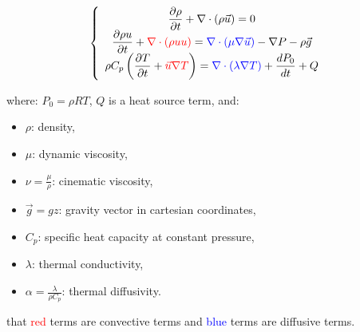 $$
\left\{
\begin{array}{c}
\displaystyle{\frac{\partial \rho }{\partial t} + \nabla \cdot (\rho \vec u) =0 }\\
\displaystyle{ \frac{\partial \rho u}{\partial t} + \textcolor{red}{\nabla \cdot (\rho u u)} =  \textcolor{blue}{\nabla \cdot \left(\mu \nabla \vec u \right)} - \nabla P -\rho \vec g }\\
\displaystyle{ \rho C_p \left( \frac{\partial T}{\partial t} + \textcolor{red}{\vec u \nabla T} \right) = \textcolor{blue}{\nabla \cdot \left(\lambda \nabla T\right)} + \frac{dP_0}{dt} + Q }
\end{array}
\right.
$$

where: $P_0=\rho R T$, $Q$ is a heat source term, and:

\begin{itemize}
\item $\rho$: density,
\item $\mu$: dynamic viscosity,
\item $\displaystyle{\nu=\frac{\mu}{\rho}}$: cinematic viscosity,
\item $\vec g=g z$: gravity vector in cartesian coordinates,
\item $C_p$: specific heat capacity at constant pressure,
\item $\lambda$: thermal conductivity,
\item $\displaystyle{\alpha=\frac{\lambda}{\rho C_p}}$: thermal diffusivity.
\end{itemize}

\Note that \textcolor{red}{red} terms are convective terms and \textcolor{blue}{blue} terms are diffusive terms.\\


